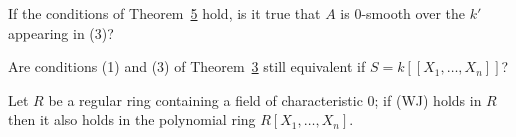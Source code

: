 \begin{exercise}\label{ex:30.2-ex}
If the conditions of Theorem~\hyperref[thm:30.5]{5} hold, is it true that $A$ is 0-smooth over
the $k'$ appearing in (3)?
\end{exercise}

\begin{exercise}\label{ex:30.3-ex}
Are conditions (1) and (3) of Theorem~\hyperref[thm:30.3]{3} still equivalent if
$S = k[[X_1, \ldots, X_n]]$?
\end{exercise}

\begin{exercise}\label{ex:30.4-ex}
Let $R$ be a regular ring containing a field of characteristic $0$; if (WJ) holds in
$R$ then it also holds in the polynomial ring $R[X_1, \ldots, X_n]$.
\end{exercise}
